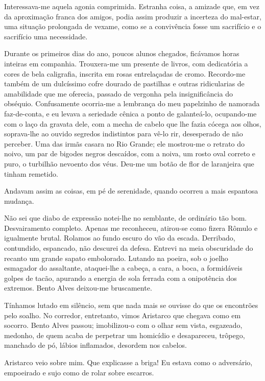 Interessava{}-me aquela agonia
comprimida. Estranha coisa, a amizade que, em vez da aproximação franca
dos amigos, podia assim produzir a incerteza do mal{}-estar, uma
situação prolongada de vexame, como se a convivência fosse um
sacrifício e o sacrifício uma necessidade. 

Durante os primeiros dias do
ano, poucos alunos chegados, ficávamos horas inteiras em companhia.
Trouxera{}-me um presente de livros, com dedicatória a cores de bela
caligrafia, inscrita em rosas entrelaçadas de cromo. Recordo{}-me
também de um dulcíssimo cofre dourado de pastilhas e outras
ridicularias de amabilidade que me oferecia, passado de vergonha pela
insignificância do obséquio. Confusamente ocorria{}-me a lembrança do
meu papelzinho de namorada faz{}-de{}-conta, e eu levava a seriedade
cênica a ponto de galanteá{}-lo, ocupando{}-me com o laço da gravata
dele, com a mecha de cabelo que lhe fazia cócega aos olhos,
soprava{}-lhe ao ouvido segredos indistintos para vê{}-lo rir,
desesperado de não perceber. Uma das irmãs casara no Rio Grande; ele
mostrou{}-me o retrato do noivo, um par de bigodes negros descaídos,
com a noiva, um rosto oval correto e puro, o turbilhão nevoento dos
véus. Deu{}-me um botão de flor de laranjeira que tinham remetido.

Andavam assim as coisas, em pé de serenidade, quando ocorreu a mais
espantosa mudança. 

Não sei que diabo de expressão notei{}-lhe no
semblante, de ordinário tão bom. Desvairamento completo. Apenas me
reconheceu, atirou{}-se como fizera Rômulo e igualmente brutal. Rolamos
ao fundo escuro do vão da escada. Derribado, contundido, espancado, não
descurei da defesa. Entrevi na meia obscuridade do recanto um grande
sapato embolorado. Lutando na poeira, sob o joelho esmagador do
assaltante, ataquei{}-lhe a cabeça, a cara, a boca, a formidáveis
golpes de tacão, apurando a energia de sola ferrada com a onipotência
dos extremos. Bento Alves deixou{}-me bruscamente. 

Tínhamos lutado em
silêncio, sem que nada mais se ouvisse do que os encontrões pelo
soalho. No corredor, entretanto, vimos Aristarco que chegava como em
socorro. Bento Alves passou; imobilizou{}-o com o olhar sem vista,
esgazeado, medonho, de quem acaba de perpetrar um homicídio e
desapareceu, trôpego, manchado de pó, lábios inflamados, 
desordem nos cabelos. 

Aristarco veio sobre mim. Que explicasse a briga! Eu estava
como o adversário, empoeirado e sujo como de rolar sobre escarros.

